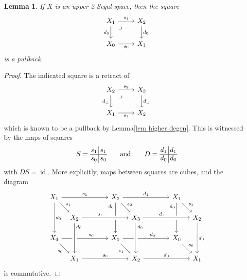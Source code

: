 \documentclass{conm-p-l}
\newtheorem{lemma}[theorem]{Lemma}
\theoremstyle{definition}
\theoremstyle{remark}
\DeclareMathOperator{\id}{id}
\begin{document}
\begin{lemma}\label{lem bot degen}
If $X$ is an upper 2-Segal space, then the square
\[ \begin{tikzcd}
X_1 \rar{s_1} \dar[swap]{d_0} \ar[dr, phantom, "\lrcorner" very near start]  & X_2 \dar{d_0} \\
X_0  \rar[swap]{s_0} & X_1
\end{tikzcd} 
\]
is a pullback.
\end{lemma}
\begin{proof}
The indicated square is a retract of 
\[
\begin{tikzcd}
X_2 \rar{s_2} \dar[swap]{d_\bot} \ar[dr, phantom, "\lrcorner" very near start]  & X_3 \dar{d_\bot} \\
X_1  \rar[swap]{s_1} & X_2
\end{tikzcd} 
\]
which is known to be a pullback by Lemma\nobreakspace \ref {lem higher degen}.
This is witnessed by the maps of squares
\[
\setlength\arraycolsep{1pt}
S = \,
\begin{matrix}
s_1 & \vline & s_1 \\
\hline
s_0 & \vline & s_0
\end{matrix}
\qquad
\text{and}
\qquad
D = 
\, \begin{matrix}
d_1 & \vline & d_1 \\
\hline
d_0 & \vline & d_0
\end{matrix}
\]
with $DS = \id$.
More explicitly, maps between squares are cubes, and the diagram
  \[
  \begin{tikzcd}[sep={30pt,between origins}]
      {X_1} \ar[rrr, "s_1"] \ar[dd, "d_0"] \ar[dr, "s_1"] & & & 
      {X_2} \ar[rrr, "d_1"] \ar[dd, "d_0"' very near start] \ar[dr, "s_2"] & & & 
      {X_1} \ar[dd, "d_0"' very near start] \ar[dr, "s_1"] & \\ &
      {X_2} \ar[rrr, pos=0.4, "s_1", crossing over]   & & & 
      {X_3} \ar[rrr, pos=0.4, "d_1", crossing over]   & & & 
      {X_2} \ar[dd,"d_0"] \\ 
      {X_0} \ar[rrr, pos=0.64, "s_0"] \ar[dr, "s_0"'] & & & 
      {X_1} \ar[rrr, pos=0.64, "d_0"] \ar[dr, "s_1"'] & & & 
      {X_0} \ar[dr, "s_0"] & \\ &
      {X_1} \ar[rrr, "s_0"] \ar[from=uu, crossing over, "d_0" very near start] & & &  
      {X_2} \ar[rrr, "d_0"] \ar[from=uu, crossing over, "d_0" very near start] & & &  
      {X_1}
  \end{tikzcd}
  \]
is commutative.
\end{proof}
\end{document}
